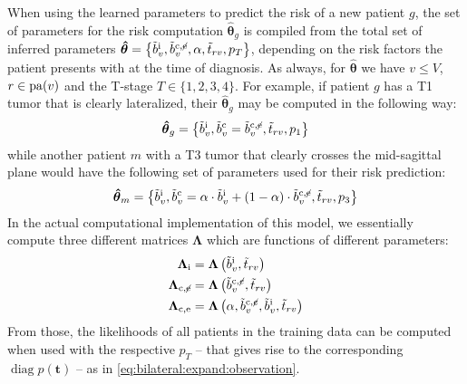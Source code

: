 \documentclass[\relativeRoot/main.tex]{subfiles}
\begin{document}
When using the learned parameters to predict the risk of a new patient $g$, the set of parameters for the risk computation $\boldsymbol{\hat{\theta}}_g$ is compiled from the total set of inferred parameters $\boldsymbol{\hat{\theta}} = \big\{ \Tilde{b}_v^\text{i} , \Tilde{b}_v^{\text{c} , \centernot{\text{e}}} , \alpha, \Tilde{t}_{rv}, p_T \big\}$, depending on the risk factors the patient presents with at the time of diagnosis. As always, for $\boldsymbol{\hat{\theta}}$ we have $v \leq V$, $r \in \operatorname{pa}(v)$ and the T-stage $T \in \{ 1, 2, 3, 4 \}$. For example, if patient $g$ has a T1 tumor that is clearly lateralized, their $\boldsymbol{\hat{\theta}}_g$ may be computed in the following way:
%
\begin{equation}
    \boldsymbol{\hat{\theta}}_g = \left\{ \tilde{b}_v^\text{i} , \tilde{b}_v^\text{c} = \tilde{b}_v^{\text{c}, \centernot{\text{e}}} , \tilde{t}_{rv} , p_1 \right\}
\end{equation}
%
while another patient $m$ with a T3 tumor that clearly crosses the mid-sagittal plane would have the following set of parameters used for their risk prediction:
%
\begin{equation}
    \boldsymbol{\hat{\theta}}_m = \left\{ \tilde{b}_v^\text{i} , \tilde{b}_v^\text{c} = \alpha \cdot \Tilde{b}_v^\text{i} + (1 - \alpha) \cdot \Tilde{b}_v^{\text{c} , \centernot{\text{e}}} , \tilde{t}_{rv} , p_3 \right\}
\end{equation}
%
In the actual computational implementation of this model, we essentially compute three different matrices $\boldsymbol{\Lambda}$ which are functions of different parameters:
%
\begin{equation}
    \begin{aligned}
        \boldsymbol{\Lambda}_\text{i} &= \boldsymbol{\Lambda} \left( \tilde{b}_v^\text{i} , \tilde{t}_{rv} \right) \\
        \boldsymbol{\Lambda}_{\text{c} , \centernot{\text{e}}} &= \boldsymbol{\Lambda}\left( \tilde{b}_v^{\text{c} , \centernot{e}} , \tilde{t}_{rv} \right) \\
        \boldsymbol{\Lambda}_{\text{c} , \text{e}} &= \boldsymbol{\Lambda} \left( \alpha , \tilde{b}_v^{\text{c} , \centernot{e}} , \tilde{b}_v^\text{i} , \tilde{t}_{rv} \right)
    \end{aligned}
\end{equation}
%
From those, the likelihoods of all patients in the training data can be computed when used with the respective $p_T$ -- that gives rise to the corresponding $\operatorname{diag}{p(\mathbf{t})}$ -- as in \cref{eq:bilateral:expand:observation}.
\end{document}
